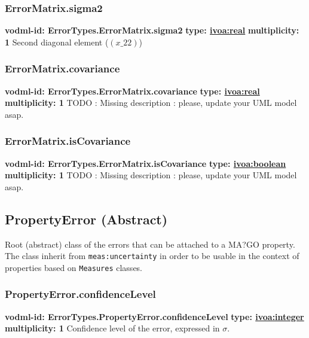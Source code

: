 {    \subsubsection{ErrorMatrix.sigma2}
      \textbf{vodml-id: ErrorTypes.ErrorMatrix.sigma2} \newline
      \textbf{type: \hyperref[sect:ivoa]{ivoa:real}} \newline
      \textbf{multiplicity: 1} \newline 
      Second diagonal element ($(x\_22)$)

    \subsubsection{ErrorMatrix.covariance}
      \textbf{vodml-id: ErrorTypes.ErrorMatrix.covariance} \newline
      \textbf{type: \hyperref[sect:ivoa]{ivoa:real}} \newline
      \textbf{multiplicity: 1} \newline 
      TODO : Missing description : please, update your UML model asap.

    \subsubsection{ErrorMatrix.isCovariance}
      \textbf{vodml-id: ErrorTypes.ErrorMatrix.isCovariance} \newline
      \textbf{type: \hyperref[sect:ivoa]{ivoa:boolean}} \newline
      \textbf{multiplicity: 1} \newline 
      TODO : Missing description : please, update your UML model asap.

  \subsection{PropertyError (Abstract)}
  \label{sect:ErrorTypes.PropertyError}
    Root (abstract) class of the errors that can be attached to a MA?GO property. The class inherit from \texttt{meas:uncertainty} in order to be usable in the context of properties based on \texttt{Measures} classes.

    \subsubsection{PropertyError.confidenceLevel}
      \textbf{vodml-id: ErrorTypes.PropertyError.confidenceLevel} \newline
      \textbf{type: \hyperref[sect:ivoa]{ivoa:integer}} \newline
      \textbf{multiplicity: 1} \newline 
      Confidence level of the error, expressed in $\sigma$.

}
